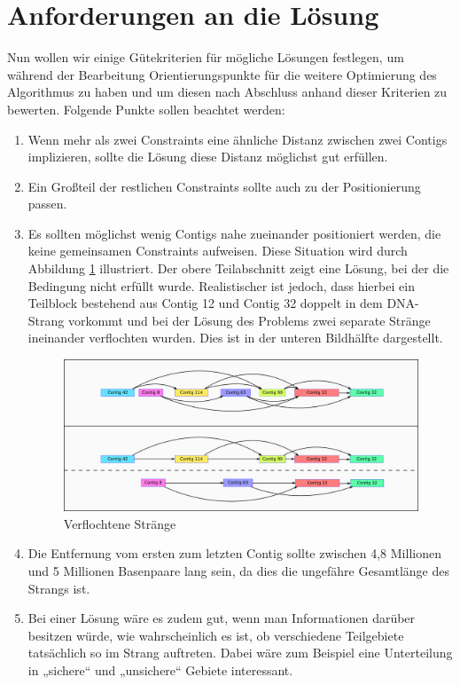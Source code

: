 \section{Anforderungen an die Lösung}
Nun wollen wir einige Gütekriterien für mögliche Lösungen festlegen, um während der Bearbeitung Orientierungspunkte für die weitere Optimierung des Algorithmus zu haben und um diesen nach Abschluss anhand dieser Kriterien zu bewerten.
Folgende Punkte sollen beachtet werden:
\begin{enumerate}
	\item Wenn mehr als zwei Constraints eine ähnliche Distanz zwischen zwei Contigs 
	implizieren, sollte die Lösung diese Distanz möglichst gut erfüllen.
	\item Ein Großteil der restlichen Constraints sollte auch zu der Positionierung passen.
	\item Es sollten möglichst wenig Contigs nahe zueinander positioniert werden, die keine gemeinsamen Constraints aufweisen. Diese Situation wird durch Abbildung \ref{gespallten} illustriert. Der obere Teilabschnitt zeigt eine Lösung, bei der die Bedingung nicht erfüllt wurde. Realistischer ist jedoch, dass hierbei ein Teilblock bestehend aus Contig 12 und Contig 32 doppelt in dem DNA-Strang vorkommt und bei der Lösung des Problems zwei separate Stränge ineinander verflochten wurden. Dies ist in der unteren Bildhälfte dargestellt.
	
	\begin{figure}
		\begin{center}
			\includegraphics[width=1\textwidth]{bilder/gespallten}
		\end{center}
		\caption{Verflochtene Stränge}
		\label{gespallten}
	\end{figure}
	
	\item Die Entfernung vom ersten zum letzten Contig sollte zwischen 4,8 Millionen und 5 Millionen Basenpaare lang sein, da dies die ungefähre Gesamtlänge des Strangs ist.
	\item Bei einer Lösung wäre es zudem gut, wenn man Informationen darüber besitzen würde, wie wahrscheinlich es ist, ob verschiedene Teilgebiete tatsächlich so im Strang auftreten. Dabei wäre zum Beispiel eine Unterteilung in „sichere“ und „unsichere“ Gebiete interessant.
\end{enumerate}

